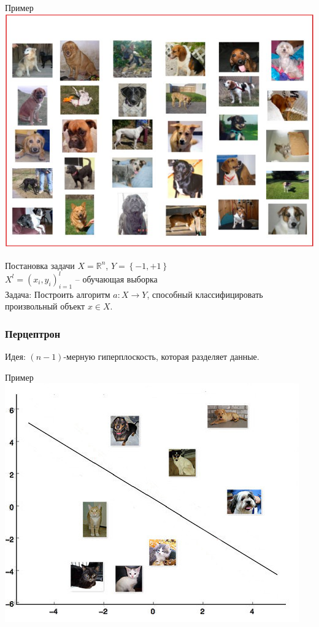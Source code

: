 \documentclass[10pt]{beamer}
\begin{document}
{
\begin{frame}{Пример}
  \centering
  \includegraphics[width=0.9 \textwidth, keepaspectratio]{images/dogs}
\end{frame}
}

\begin{frame}{Постановка задачи}
  $X = \mathbb{R}^n$, ${Y = \left\{ -1, + 1\right\}}$\\
  ${X^l = (x_i, y_i)_{i = 1}^l}$ -- обучающая выборка\\
  \bigbreak
  \alert{Задача}: Построить алгоритм ${a \colon X \rightarrow Y}$, способный классифицировать произвольный объект ${x \in X}$.\\
  
\end{frame}

{
\begin{frame}\frametitle{Перцептрон}
  \alert{Идея}: $(n-1)$-мерную гиперплоскость, которая разделяет данные.
\end{frame}
}

\begin{frame}{Пример}
  \centering
  \includegraphics[width=0.9 \textwidth, keepaspectratio]{images/catdog1}
\end{frame}
\end{document}
